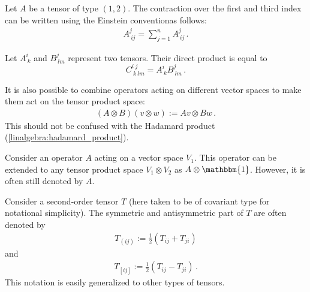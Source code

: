     \begin{example}
        Let $A$ be a tensor of type $(1,2)$. The contraction over the first and third index can be written using the Einstein conventionas follows:
        \begin{gather}
            A_{\ ij}^j = \sum_{j=1}^nA_{\ ij}^j\,.
        \end{gather}
    \end{example}

    \begin{example}
        Let $A_{\ k}^i$ and $B_{\ lm}^j$ represent two tensors. Their direct product is equal to \[C_{\ k\ lm}^{i\ j} = A_{\ k}^iB_{\ lm}^j\,.\]
    \end{example}
    \begin{example}\label{vector:operator_product}
        It is also possible to combine operators acting on different vector spaces to make them act on the tensor product space:
        \begin{gather}
            (A\otimes B)(v\otimes w) := Av\otimes Bw\,.
        \end{gather}
        This should not be confused with the Hadamard product (\cref{linalgebra:hadamard_product}).
    \end{example}
    \begin{notation}\label{vector:tensor_abuse}
        Consider an operator $A$ acting on a vector space $V_1$. This operator can be extended to any tensor product space $V_1\otimes V_2$ as $A\otimes\mathbbm{1}$. However, it is often still denoted by $A$.
    \end{notation}

    \begin{notation}
        Consider a second-order tensor $T$ (here taken to be of covariant type for notational simplicity). The symmetric and antisymmetric part of $T$ are often denoted by
        \begin{gather}
            T_{(ij)} := \frac{1}{2}\left(T_{ij} + T_{ji}\right)
        \end{gather}
        and
        \begin{gather}
            T_{[ij]} := \frac{1}{2}\left(T_{ij} - T_{ji}\right)\,.
        \end{gather}
        This notation is easily generalized to other types of tensors.
    \end{notation}


